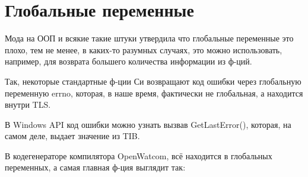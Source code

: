 ﻿\section{Глобальные переменные}

Мода на ООП и всякие такие штуки утвердила что глобальные переменные это плохо, тем не менее, в каких-то разумных
случаях, это можно использовать, например, для возврата большего количества информации из ф-ций. 

Так, некоторые стандартные ф-ции Си возвращают код ошибки через глобальную переменную errno, которая, в наше
время, фактически не глобальная, а находится внутри \ac{TLS}.

В Windows API код ошибки можно узнать вызвав GetLastError(), 
которая, на самом деле, выдает значение из \ac{TIB}.

В кодегенераторе компилятора OpenWatcom, всё находится в глобальных переменных,
а самая главная ф-ция выглядит так:

